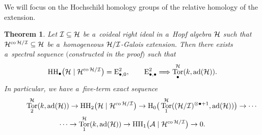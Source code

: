 \documentclass[pdftex]{sigma}
\numberwithin{equation}{section}
\newtheorem{Theorem}{Theorem}[section]
\DeclareMathOperator{\ad}{ad}
\DeclareMathOperator{\co}{co}
\DeclareMathOperator{\Tor}{Tor}
\begin{document}
We will focus on the Hochschild homology groups of the relative homology of the extension.
\begin{Theorem}
Let ${\cal I}\subseteq {\cal H}$ be a~coideal right ideal in a~Hopf algebra ${\cal H}$
such that ${\cal H}^{\co{\cal H}/{\cal I}}\subseteq {\cal H}$ be a~homogeneous ${\cal H}/{\cal I}$-Galois extension.
Then there exists a~spectral sequence $($constructed in the proof$)$ such that
\begin{gather*}
{\rm HH}_\bullet\big({\cal H}\mid {\cal H}^{\co{\cal H}/{\cal I}}\big)={\rm E}^2_{\bullet,0},
\qquad
{\rm E}^2_{\bullet,\bullet}\Longrightarrow \Tor^{{\cal H}}_{\bullet}(k, \ad({\cal H})).
\end{gather*}
In particular, we have a~five-term exact sequence
\begin{gather*}
\phantom{\cdots\to }
\Tor^{{\cal H}}_2(k,\ad({\cal H}))\to {\rm HH}_2\big({\cal H}\mid {\cal H}^{\co{\cal H}/{\cal I}}\big)\to
{\rm H}_0\big(\Tor^{{\cal H}}_1(({\cal H}/{\cal I})^{\otimes\bullet +1},\ad({\cal H}))\big) \to \cdots
\\
\cdots\to \Tor^{{\cal H}}_1(k, \ad({\cal H})) \to {\rm HH}_1\big({\cal A}\mid {\cal H}^{\co{\cal H}/{\cal I}}\big) \to 0.
\end{gather*}
\end{Theorem}
\end{document}
